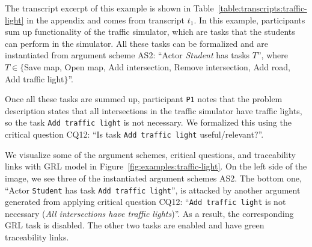 The transcript excerpt of this example is shown in Table~\ref{table:transcripts:traffic-light} in the appendix and comes from transcript $t_1$. In this example, participants sum up functionality of the traffic simulator, which are tasks that the students can perform in the simulator. All these tasks can be formalized and are instantiated from  argument scheme AS2: ``Actor \emph{Student} has tasks $T$'', where $T\in\{$Save map, Open map, Add intersection, Remove intersection, Add road, Add traffic light$\}$''. 

Once all these tasks are summed up, participant \texttt{P1} notes that the problem description states that all intersections in the traffic simulator have traffic lights, so the task \texttt{Add traffic light} is not necessary. We formalized this using the critical question CQ12: ``Is task \texttt{Add traffic light} useful/relevant?''. %

We visualize some of the argument schemes, critical questions, and traceability links with GRL model in Figure~\ref{fig:examples:traffic-light}. On the left side of the image, we see three of the instantiated argument schemes AS2. The bottom one, ``Actor \texttt{Student} has task \texttt{Add traffic light}'', is attacked by another argument generated from applying critical question CQ12: ``\texttt{Add traffic light} is %
not necessary (\emph{All intersections have traffic lights})''. As a result, the corresponding GRL task is disabled. The other two tasks are enabled and have green traceability links.

